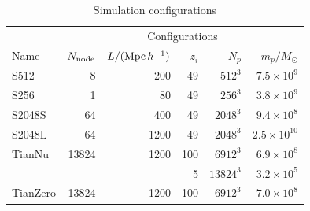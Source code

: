 \documentclass[10pt,twocolumn,preprint]{emulateapj}
\newcommand{\Msun}{M_\odot}
\begin{document}
\begin{table}[]
\centering
\caption{Simulation configurations}
\label{t.sim}
\begin{tabular}{lrrrrr}
\hline
& \multicolumn{5}{c}{Configurations}\\
\cline{2-6}
Name  & $N_{\rm node}$ & $L/({\rm Mpc\,}h^{-1})$ & $z_i$ & $N_p$ & $m_p/\Msun$ \\
\hline
S512   & 8     & 200   & 49   & $512^3$  & $7.5\times 10^9$    \\
S256   & 1     & 80    & 49   & $256^3$  & $3.8\times 10^9$    \\
S2048S & 64    & 400   & 49   & $2048^3$ & $9.4\times 10^8$    \\
S2048L & 64    & 1200  & 49   & $2048^3$ & $2.5\times 10^{10}$ \\
\hline
TianNu & 13824 & 1200  & 100  & $6912^3$ & $6.9\times 10^8$\\
       &       &       & 5    & $13824^3$& $3.2\times 10^5$\\
TianZero & 13824 & 1200 & 100 & $6912^3$ & $7.0\times 10^8$\\
\hline
\end{tabular}
\end{table}
\end{document}
